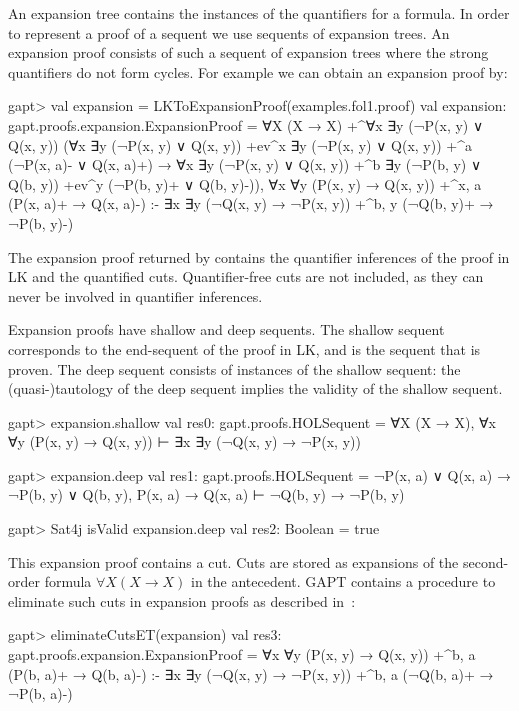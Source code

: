 \documentclass[a4paper,11pt]{book}
\newcommand{\impl}{\to} %
\newcommand{\cli}[1]{{\ttfamily {#1}}}
\begin{document}
An expansion tree contains the instances of the quantifiers for a formula.  In order
to represent a proof of a sequent we use sequents of expansion trees.  An
expansion proof consists of such a sequent of expansion trees where the
strong quantifiers do not form cycles.
For example we can obtain an expansion proof by:
\begin{clilisting}
gapt> val expansion = LKToExpansionProof(examples.fol1.proof)
val expansion: gapt.proofs.expansion.ExpansionProof = ∀X (X → X)
  +^{∀x ∃y (¬P(x, y) ∨ Q(x, y))}
    (∀x ∃y (¬P(x, y) ∨ Q(x, y)) +ev^{x}
        ∃y (¬P(x, y) ∨ Q(x, y))
        +^{a} (¬P(x, a)- ∨ Q(x, a)+) →
      ∀x ∃y (¬P(x, y) ∨ Q(x, y))
        +^{b} ∃y (¬P(b, y) ∨ Q(b, y)) +ev^{y} (¬P(b, y)+ ∨ Q(b, y)-)),
∀x ∀y (P(x, y) → Q(x, y)) +^{x, a} (P(x, a)+ → Q(x, a)-)
:-
∃x ∃y (¬Q(x, y) → ¬P(x, y)) +^{b, y} (¬Q(b, y)+ → ¬P(b, y)-)

\end{clilisting}

The expansion proof returned by \cli{LKToExpansionProof} contains the
quantifier inferences of the proof in LK and the quantified cuts.
Quantifier-free cuts are not included, as they can never be involved in
quantifier inferences.

Expansion proofs have shallow and deep sequents.  The shallow sequent
corresponds to the end-sequent of the proof in LK, and is the sequent that is
proven.  The deep sequent consists of instances of the shallow sequent: the
(quasi-)tautology of the deep sequent implies the validity of the shallow
sequent.
\begin{clilisting}
gapt> expansion.shallow
val res0: gapt.proofs.HOLSequent = ∀X (X → X), ∀x ∀y (P(x, y) → Q(x, y)) ⊢ ∃x ∃y (¬Q(x, y) → ¬P(x, y))

gapt> expansion.deep
val res1: gapt.proofs.HOLSequent = ¬P(x, a) ∨ Q(x, a) → ¬P(b, y) ∨ Q(b, y), P(x, a) → Q(x, a) ⊢ ¬Q(b, y) → ¬P(b, y)

gapt> Sat4j isValid expansion.deep
val res2: Boolean = true

\end{clilisting}

This expansion proof contains a cut.  Cuts are stored as expansions of the
second-order formula $\forall X (X \impl X)$ in the antecedent.  GAPT contains
a procedure to eliminate such cuts in expansion proofs as described
in~\cite{Hetzl2013Expansion}:
\begin{clilisting}
gapt> eliminateCutsET(expansion)
val res3: gapt.proofs.expansion.ExpansionProof = ∀x ∀y (P(x, y) → Q(x, y)) +^{b, a} (P(b, a)+ → Q(b, a)-)
:-
∃x ∃y (¬Q(x, y) → ¬P(x, y)) +^{b, a} (¬Q(b, a)+ → ¬P(b, a)-)

\end{clilisting}
\end{document}
